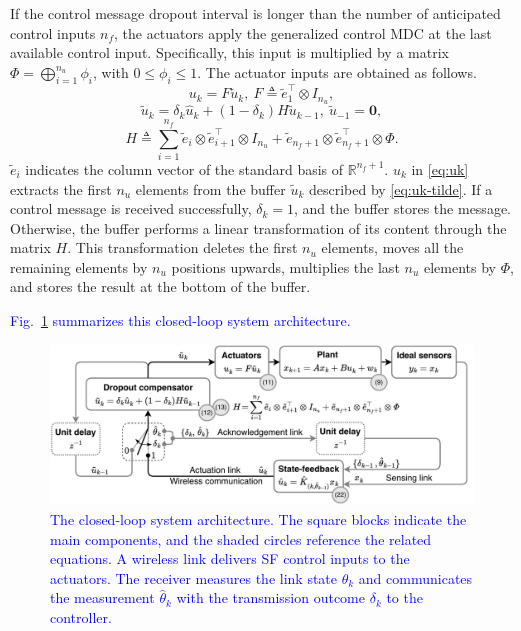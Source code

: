\documentclass[journal,twoside,web]{ieeecolor}
\begin{document}
If the control message dropout interval is longer than the number of anticipated control inputs $n_f$, the actuators apply the generalized control MDC at the last available control input.  Specifically, this input is multiplied by a matrix $\mathit{\Phi}=\bigoplus_{i=1}^{n_u} \phi_i$, with $0 \leq \phi_i \leq 1$. 
The actuator inputs are obtained as follows.
\begin{equation}\label{eq:uk}
    u_k = F \tilde{u}_k,~F \triangleq \tilde{e}_{1}^{\top} \otimes I_{n_u},
\end{equation}
\begin{equation}\label{eq:uk-tilde}
    \tilde{u}_k = \delta_k \hat{u}_k + \left(1-\delta_k\right) H \tilde{u}_{k-1},~\tilde{u}_{-1} = \mathbf{0},
\end{equation}
\begin{equation}\label{eq:H}
    H \triangleq \sum_{i=1}^{n_f} \tilde{e}_{i} \otimes \tilde{e}_{i+1}^{\top} \otimes I_{n_u} + 
    \tilde{e}_{n_f+1} \otimes \tilde{e}_{n_f+1}^{\top} \otimes \mathit{\Phi}.
\end{equation}
$\tilde{e}_{i}$ indicates the column vector of the standard basis of $\mathbb{R}^{n_f+1}$.
$u_k$ in \eqref{eq:uk} extracts the first $n_u$ elements from the buffer $\tilde{u}_k$ described by \eqref{eq:uk-tilde}.
If a control message is received successfully, $\delta_k = 1$, and the buffer stores the message. Otherwise, the buffer performs a linear transformation of its content through the matrix $H$. This transformation deletes the first $n_u$ elements,  moves all the remaining elements by $n_u$ positions upwards, multiplies the last $n_u$ elements by $\mathit{\Phi}$, and stores the result at the bottom of the buffer. 

\textcolor{blue}{Fig.~\ref{fig:architecture} summarizes this closed-loop system architecture.}
\begin{figure}
\begin{center}
\vspace{5pt}\includegraphics[width=\columnwidth]{./wncs-lcss-cdc-25-architecture.pdf}\vspace{-4pt}
\caption{\textcolor{blue}{The closed-loop system architecture. The square blocks indicate the main components, and the shaded circles reference the related equations. A wireless link delivers SF control inputs to the actuators. The receiver measures the link state $\theta_k$ and communicates the measurement $\hat{\theta}_k$ with the transmission outcome $\delta_k$ to the controller. }}\label{fig:architecture}
\end{center}
\end{figure}
\end{document}
